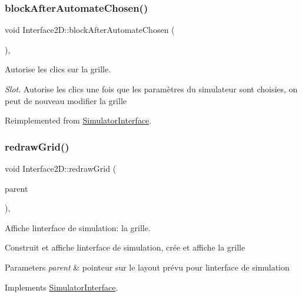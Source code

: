 \subsubsection{\texorpdfstring{block\+After\+Automate\+Chosen()}{blockAfterAutomateChosen()}}
{\footnotesize\ttfamily void Interface2\+D\+::block\+After\+Automate\+Chosen (\begin{DoxyParamCaption}{ }\end{DoxyParamCaption})\hspace{0.3cm}{\ttfamily [protected]}, {\ttfamily [virtual]}}



Autorise les clics sur la grille. 

{\itshape Slot}. Autorise les clics une fois que les paramètres du simulateur sont choisies, on peut de nouveau modifier la grille 

Reimplemented from \mbox{\hyperlink{class_simulator_interface}{Simulator\+Interface}}.

\mbox{\label{class_interface2_d_ac6472a84605f28bb34bff02850ac8414}} 
\subsubsection{\texorpdfstring{redraw\+Grid()}{redrawGrid()}}
{\footnotesize\ttfamily void Interface2\+D\+::redraw\+Grid (\begin{DoxyParamCaption}\item[{Q\+Box\+Layout $\ast$}]{parent }\end{DoxyParamCaption})\hspace{0.3cm}{\ttfamily [protected]}, {\ttfamily [virtual]}}



Affiche l\textquotesingle{}interface de simulation\+: la grille. 

Construit et affiche l\textquotesingle{}interface de simulation, crée et affiche la grille 
\begin{DoxyParams}{Parameters}
{\em parent} & pointeur sur le layout prévu pour l\textquotesingle{}interface de simulation \\
\hline
\end{DoxyParams}


Implements \mbox{\hyperlink{class_simulator_interface}{Simulator\+Interface}}.

\mbox{\label{class_interface2_d_ac9b111f941584c6858c2fc293921cd58}} 
